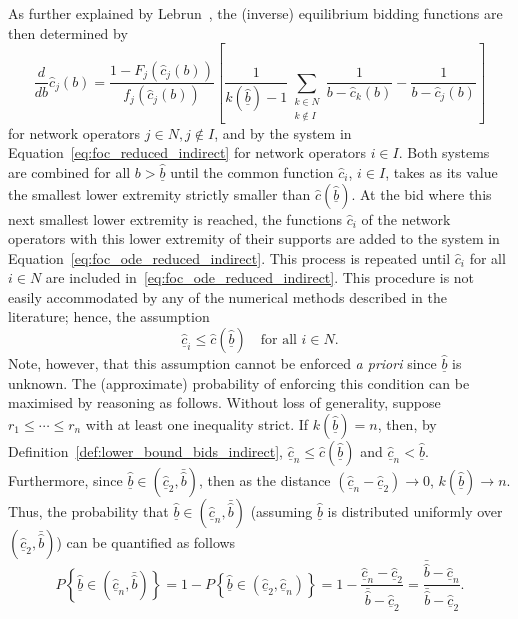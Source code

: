 As further explained by Lebrun~\cite{Lebrun2006}, the (inverse) equilibrium bidding functions are then determined by
\begin{equation}
  \label{eq:foc_ode_reduced_indirect}
  \frac{d}{db}\hat{c}_j(b) = \frac{1 - F_j(\hat{c}_j(b))}{f_j(\hat{c}_j(b))} \left[ \frac{1}{k(\underline{\hat{b}}) - 1}\sum_{\substack{k\in N\\ k\not\in I}}\frac{1}{b - \hat{c}_k(b)} - \frac{1}{b - \hat{c}_j(b)}\right]
\end{equation}
for network operators $j\in N, j\not\in I$, and by the system in Equation~\eqref{eq:foc_reduced_indirect} for network operators $i\in I$. Both systems are combined for all $b > \underline{\hat{b}}$ until the common function $\hat{c}_i$, $i\in I$, takes as its value the smallest lower extremity strictly smaller than $\hat{c}(\underline{\hat{b}})$. At the bid where this next smallest lower extremity is reached, the functions $\hat{c}_i$ of the network operators with this lower extremity of their supports are added to the system in Equation~\eqref{eq:foc_ode_reduced_indirect}. This process is repeated until $\hat{c}_i$ for all $i\in N$ are included in~\eqref{eq:foc_ode_reduced_indirect}. This procedure is not easily accommodated by any of the numerical methods described in the literature; hence, the assumption
\begin{equation}
  \underline{\hat{c}}_i \leq \hat{c}(\underline{\hat{b}}) \quad\textrm{for all } i\in N.
\end{equation}
Note, however, that this assumption cannot be enforced \emph{a priori} since $\underline{\hat{b}}$ is unknown. The (approximate) probability of enforcing this condition can be maximised by reasoning as follows. Without loss of generality, suppose $r_1\leq\cdots\leq r_n$ with at least one inequality strict. If $k(\underline{\hat{b}})=n$, then, by Definition~\ref{def:lower_bound_bids_indirect}, $\underline{\hat{c}}_n\leq \hat{c}(\underline{\hat{b}})$ and $\underline{\hat{c}}_n < \underline{\hat{b}}$. Furthermore, since $\underline{\hat{b}}\in (\underline{\hat{c}}_2, \bar{\hat{b}})$, then as the distance $(\underline{\hat{c}}_n-\underline{\hat{c}}_2)\to 0$, $k(\underline{\hat{b}})\to n$. Thus, the probability that $\underline{\hat{b}}\in (\underline{\hat{c}}_n, \bar{\hat{b}})$ (assuming $\underline{\hat{b}}$ is distributed uniformly over $(\underline{\hat{c}}_2, \bar{\hat{b}})$) can be quantified as follows
\begin{equation}
  P\left\{ \underline{\hat{b}}\in (\underline{\hat{c}}_n, \bar{\hat{b}}) \right\} = 1 - P\left\{\underline{\hat{b}}\in(\underline{\hat{c}}_2, \underline{\hat{c}}_n)\right\} = 1 - \frac{\underline{\hat{c}}_n - \underline{\hat{c}}_2}{\bar{\hat{b}}-\underline{\hat{c}}_2} = \frac{\bar{\hat{b}} - \underline{\hat{c}}_n}{\bar{\hat{b}} - \underline{\hat{c}}_2}.
\end{equation}
